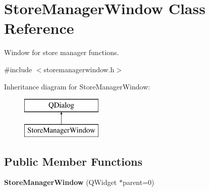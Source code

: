 \hypertarget{class_store_manager_window}{}\section{Store\+Manager\+Window Class Reference}
\label{class_store_manager_window}


Window for store manager functions.  




{\ttfamily \#include $<$storemanagerwindow.\+h$>$}

Inheritance diagram for Store\+Manager\+Window\+:\begin{figure}[H]
\begin{center}
\leavevmode
\includegraphics[height=2.000000cm]{class_store_manager_window}
\end{center}
\end{figure}
\subsection*{Public Member Functions}
\begin{DoxyCompactItemize}
\item 
\mbox{\label{class_store_manager_window_a1e2c07d90b58491c90334767438d3741}} 
{\bfseries Store\+Manager\+Window} (Q\+Widget $\ast$parent=0)
\end{DoxyCompactItemize}
